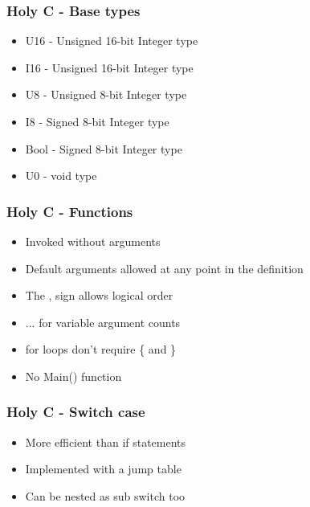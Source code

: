 \documentclass{beamer}
\begin{document}
	\begin{frame}
		\frametitle{Holy C - Base types}
		\begin{itemize}
			\item U16 - Unsigned 16-bit Integer type

			\item I16 - Unsigned 16-bit Integer type

			\item U8 - Unsigned 8-bit Integer type

			\item I8 - Signed 8-bit Integer type

			\item Bool - Signed 8-bit Integer type

			\item U0 - void type
		\end{itemize}
	\end{frame}

	\begin{frame}[fragile]
		\frametitle{Holy C - Functions}
		\begin{itemize}
			\item Invoked without arguments

			\item Default arguments allowed at any point in the definition

			\item The , sign allows logical order

			\item ... for variable argument counts

			\item for loops don't require \{ and \}

			\item No Main() function
		\end{itemize}
	\end{frame}

	\begin{frame}[fragile]
		\frametitle{Holy C - Switch case}
		\begin{itemize}
			\item More efficient than if statements

			\item Implemented with a jump table

			\item Can be nested as sub switch too
		\end{itemize}
	\end{frame}
\end{document}
